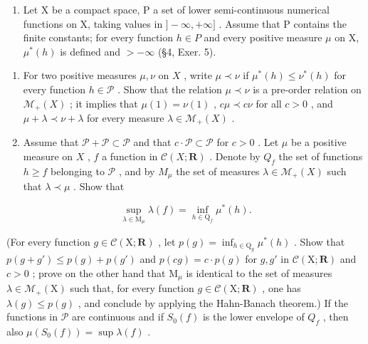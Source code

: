 \begin{enumerate}
\def\labelenumi{\arabic{enumi})}
\setcounter{enumi}{1}
\tightlist
\item
  Let X be a compact space, P a set of lower semi-continuous numerical functions on X, taking values in \(]-\infty,+\infty]\) . Assume that P contains the finite constants; for every function \(h\in P\) and every positive measure \(\mu\) on X, \(\mu^{*}(h)\) is defined and \(>-\infty\) (§4, Exer. 5).
\end{enumerate}

\begin{enumerate}
\def\labelenumi{\alph{enumi})}
\item
  For two positive measures \(\mu, \nu\) on \(X\) , write \(\mu \prec \nu\) if \(\mu^{*}(h) \leqslant \nu^{*}(h)\) for every function \(h \in \mathcal{P}\) . Show that the relation \(\mu \prec \nu\) is a pre-order relation on \(\mathcal{M}_{+}(X)\) ; it implies that \(\mu(1) = \nu(1)\) , \(c\mu \prec c\nu\) for all \(c > 0\) , and \(\mu + \lambda \prec \nu + \lambda\) for every measure \(\lambda \in \mathcal{M}_{+}(X)\) .
\item
  Assume that \(\mathcal{P} + \mathcal{P} \subset \mathcal{P}\) and that \(c \cdot \mathcal{P} \subset \mathcal{P}\) for \(c > 0\) . Let \(\mu\) be a positive measure on \(X\) , \(f\) a function in \(\mathcal{C}(X; \mathbf{R})\) . Denote by \(Q_f\) the set of functions \(h \geqslant f\) belonging to \(\mathcal{P}\) , and by \(M_\mu\) the set of measures \(\lambda \in \mathcal{M}_+(X)\) such that \(\lambda \prec \mu\) . Show that
\end{enumerate}

\[
\sup _ {\lambda \in \mathrm{M} _ {\mu}} \lambda (f) = \inf _ {h \in \mathrm{Q} _ {f}} \mu^ {*} (h).
\]

(For every function \(g \in \mathcal{C}(\mathrm{X};\mathbf{R})\) , let \(p(g) = \inf_{h \in \mathrm{Q}_g} \mu^*(h)\) . Show that \(p(g + g') \leqslant p(g) + p(g')\) and \(p(cg) = c \cdot p(g)\) for \(g, g'\) in \(\mathcal{C}(\mathrm{X};\mathbf{R})\) and \(c > 0\) ; prove on the other hand that \(\mathrm{M}_{\mu}\) is identical to the set of measures \(\lambda \in \mathcal{M}_{+}(\mathrm{X})\) such that, for every function \(g \in \mathcal{C}(\mathrm{X};\mathbf{R})\) , one has \(\lambda(g) \leqslant p(g)\) , and conclude by applying the Hahn-Banach theorem.) If the functions in \(\mathcal{P}\) are continuous and if \(S_0(f)\) is the lower envelope of \(Q_f\) , then also \(\mu(S_0(f)) = \sup \lambda(f)\) .

